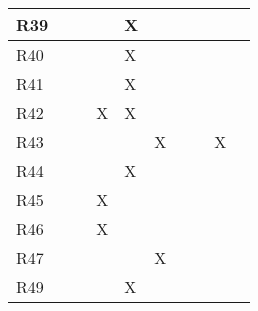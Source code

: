 \documentclass{article}
\begin{document}
\begin{tabular}{|l|l|l|l|l|l|l|l|l|l|}
R39 &&&&X&&&& \\\hline
R40 &&&&X&&&& \\\hline
R41 &&&&X&&&& \\\hline
R42 &&&X&X&&&& \\\hline
R43 &&&&&X&&&X \\\hline
R44 &&&&X&&&& \\\hline
R45 &&&X&&&&& \\\hline
R46 &&&X&&&&& \\\hline
R47 &&&&&X&&& \\\hline
R49 &&&&X&&&& \\\hline
\end{tabular}
\newpage
\end{document}
